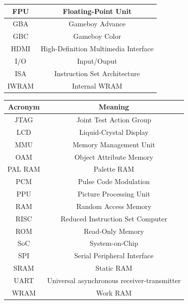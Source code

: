\begin{enumerate}
{\begin{table}[ht]
\begin{tabular}{|c|c|}
				\hline
				FPU & Floating-Point Unit \\
				\hline
				GBA & Gameboy Advance \\
				\hline
				GBC & Gameboy Color \\
				\hline
				HDMI & High-Definition Multimedia Interface \\
				\hline
				I/O & Input/Ouput \\
				\hline
				ISA & Instruction Set Architecture \\
				\hline
				IWRAM & Internal WRAM \\
				\hline
			\end{tabular}
		\end{table}

		\begin{table}[ht]
			\centering
			\begin{tabular}{|c|c|}
				\hline
				\textbf{Acronym} & \textbf{Meaning} \\
				\hline
				JTAG & Joint Test Action Group \\
				\hline
				LCD & Liquid-Crystal Display \\
				\hline
				MMU & Memory Management Unit \\
				\hline
				OAM & Object Attribute Memory \\
				\hline
				PAL RAM & Palette RAM \\
				\hline
				PCM & Pulse Code Modulation \\
				\hline
				PPU & Picture Processing Unit \\
				\hline
				RAM & Random Access Memory \\
				\hline
				RISC & Reduced Instruction Set Computer \\
				\hline
				ROM & Read-Only Memory \\
				\hline
				SoC & System-on-Chip \\
				\hline
				SPI & Serial Peripheral Interface \\
				\hline
				SRAM & Static RAM \\
				\hline
				UART & Universal asynchronous receiver-transmitter \\
				\hline
				WRAM & Work RAM \\
				\hline
			\end{tabular}
		\end{table}
		}
\end{enumerate}

